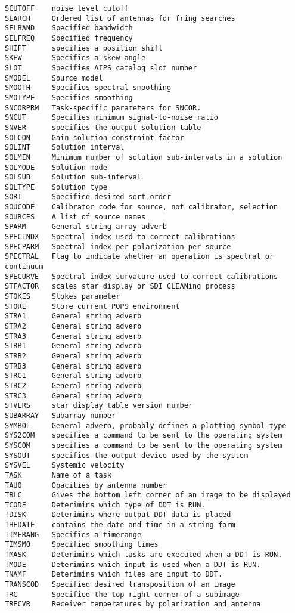 \begin{verbatim}
SCUTOFF    noise level cutoff
SEARCH     Ordered list of antennas for fring searches
SELBAND    Specified bandwidth
SELFREQ    Specified frequency
SHIFT      specifies a position shift
SKEW       Specifies a skew angle
SLOT       Specifies AIPS catalog slot number
SMODEL     Source model
SMOOTH     Specifies spectral smoothing
SMOTYPE    Specifies smoothing
SNCORPRM   Task-specific parameters for SNCOR.
SNCUT      Specifies minimum signal-to-noise ratio
SNVER      specifies the output solution table
SOLCON     Gain solution constraint factor
SOLINT     Solution interval
SOLMIN     Minimum number of solution sub-intervals in a solution
SOLMODE    Solution mode
SOLSUB     Solution sub-interval
SOLTYPE    Solution type
SORT       Specified desired sort order
SOUCODE    Calibrator code for source, not calibrator, selection
SOURCES    A list of source names
SPARM      General string array adverb
SPECINDX   Spectral index used to correct calibrations
SPECPARM   Spectral index per polarization per source
SPECTRAL   Flag to indicate whether an operation is spectral or continuum
SPECURVE   Spectral index survature used to correct calibrations
STFACTOR   scales star display or SDI CLEANing process
STOKES     Stokes parameter
STORE      Store current POPS environment
STRA1      General string adverb
STRA2      General string adverb
STRA3      General string adverb
STRB1      General string adverb
STRB2      General string adverb
STRB3      General string adverb
STRC1      General string adverb
STRC2      General string adverb
STRC3      General string adverb
STVERS     star display table version number
SUBARRAY   Subarray number
SYMBOL     General adverb, probably defines a plotting symbol type
SYS2COM    specifies a command to be sent to the operating system
SYSCOM     specifies a command to be sent to the operating system
SYSOUT     specifies the output device used by the system
SYSVEL     Systemic velocity
TASK       Name of a task
TAU0       Opacities by antenna number
TBLC       Gives the bottom left corner of an image to be displayed
TCODE      Deterimins which type of DDT is RUN.
TDISK      Deterimins where output DDT data is placed
THEDATE    contains the date and time in a string form
TIMERANG   Specifies a timerange
TIMSMO     Specified smoothing times
TMASK      Deterimins which tasks are executed when a DDT is RUN.
TMODE      Deterimins which input is used when a DDT is RUN.
TNAMF      Deterimins which files are input to DDT.
TRANSCOD   Specified desired transposition of an image
TRC        Specified the top right corner of a subimage
TRECVR     Receiver temperatures by polarization and antenna

\end{verbatim}
